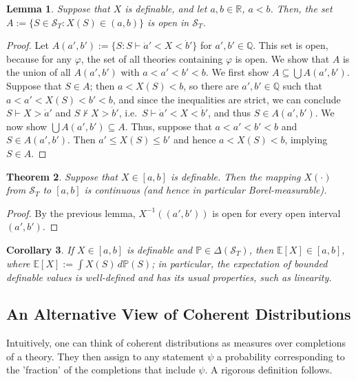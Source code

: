 \documentclass[12pt]{article}
\newcommand{\PP}{\mathbb{P}}
\newcommand{\vp}{\varphi}
\newcommand{\EE}{\mathbb{E}}
\newcommand{\RR}{\mathbb{R}}
\newcommand{\QQ}{\mathbb{Q}}
\newcommand{\cS}{\mathcal{S}}
\theoremstyle{plain}
\newtheorem{theorem}{Theorem}[subsection]
\newtheorem{lemma}[theorem]{Lemma}
\newtheorem{corollary}[theorem]{Corollary}
\theoremstyle{definition}
\theoremstyle{remark}
\begin{document}
\begin{lemma}
Suppose that $X$ is definable, and let $a,b\in\RR$, $a<b$. Then, the set $A := \{S\in\cS_T : X(S) \in (a,b)\}$ is open in $\cS_T$.
\end{lemma}
\begin{proof}
Let $A(a',b') := \{S : S\vdash\dot a' < X < \dot b'\}$ for $a',b'\in\QQ$. This set is open, because for any $\vp$, the set of all theories containing $\vp$ is open. We show that $A$ is the union of all $A(a',b')$ with $a < a' < b' < b$.
We first show $A \subseteq \bigcup A(a',b')$. Suppose that $S\in A$; then $a < X(S) < b$, so there are $a',b'\in\QQ$ such that $a<a'<X(S)<b'<b$, and since the inequalities are strict, we can conclude $S\vdash X > \dot a'$ and $S\nvdash X > \dot b'$, i.e.\ $S\vdash\dot a' < X < \dot b'$, and thus $S\in A(a',b')$.
We now show $\bigcup A(a',b')\subseteq A$. Thus, suppose that $a < a' < b' < b$ and $S\in A(a',b')$. Then $a' \le X(S) \le b'$ and hence $a < X(S) < b$, implying $S\in A$.
\end{proof}
\begin{theorem}
Suppose that $X\in[a,b]$ is definable. Then the mapping $X(\cdot)$ from $\cS_T$ to $[a,b]$ is continuous (and hence in particular Borel-measurable).
\end{theorem}
\begin{proof}
By the previous lemma, $X^{-1}((a',b'))$ is open for every open interval $(a',b')$.
\end{proof}
\begin{corollary}
If $X\in[a,b]$ is definable and $\PP\in\Delta(\cS_T)$, then $\EE[X]\in[a,b]$, where $\EE[X] := \int X(S)\,d\PP(S)$; in particular, the expectation of bounded definable values is well-defined and has its usual properties, such as linearity.
\end{corollary}
\subsection{An Alternative View of Coherent Distributions} \label{An Alternative View of Coherent Distributions}
Intuitively, one can think of coherent distributions as measures over completions of a theory. They then assign to any statement $\psi$ a probability corresponding to the 'fraction' of the completions that include $\psi$. A rigorous definition follows.
\end{document}
